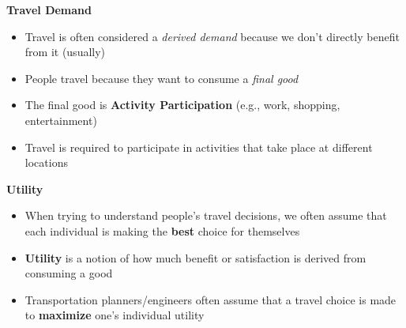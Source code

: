 \documentclass[aspectratio=169]{beamer}
\begin{document}
\begin{frame}
	
	\textbf{Travel Demand}
	\vspace{4mm}
	
	\begin{itemize}
		\item Travel is often considered a \textit{derived demand} because we don’t directly benefit from it (usually)
		
		\item People travel because they want to consume a \textit{final good}
		
		\item The final good is \textbf{Activity Participation} (e.g., work, shopping, entertainment)
		 
		\item Travel is required to participate in activities that take place at different locations
	\end{itemize}
	
\end{frame}





\begin{frame}
	
	\textbf{Utility}
	\vspace{4mm}
	
	\begin{itemize}
		\item When trying to understand people’s travel decisions, we often assume that each individual is making the \textbf{best} choice for themselves
		
		\item \textbf{Utility} is a notion of how much benefit or satisfaction is derived from consuming a good
		
		\item Transportation planners/engineers often assume that a travel choice is made to \textbf{maximize} one’s individual utility
	\end{itemize}
	
	
\end{frame}
\end{document}
